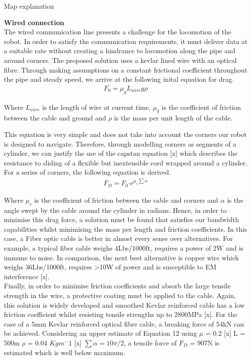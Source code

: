 \documentclass[11pt]{article}		%
\begin{document}
        Map explanation

        \textbf{Wired connection}\\
        The wired communication line presents a challenge for the locomotion of the robot. In order to satisfy the communication requirements, it must deliver data at a suitable rate without creating a hindrance to locomotion along the pipe and around corners. The proposed solution uses a kevlar lined wire with an optical fibre. 
        Through making assumptions on a constant frictional coefficient throughout the pipe and steady speed, we arrive at the following inital equation for drag. 
        \begin{align}
				F_0 = \mu_g L_{wire}   g \rho
		\end{align}
        
        Where $L_{wire}$ is the length of wire at current time, $\mu_g$ is the coefficient of friction between the cable and ground and $\rho$ is the mass per unit length of the cable.
        
        This equation is very simple and does not take into account the corners our robot is designed to navigate. Therefore, through modelling corners as segments of a cylinder, we can justify the use of the capstan equation [x] which describes the resistance to sliding of a flexible but inextensible cord wrapped around a cylinder. For a series of corners, the following equation is derived.
        \begin{align}
                F_D = F_0 \boldsymbol{\cdot} {e}^{\mu_c \sum \alpha}
        \end{align}

		Where $\mu_c$ is the coefficient of friction between the cable and corners and $\alpha$ is the angle swept by the cable around the cylinder in radians. 
	    Hence, in order to minimise this drag force, a solution must be found that satisfies our bandwidth capabilities whilst minimising the mass per length and friction coefficients.  
	    In this case, a Fiber optic cable is better in almost every sense over alternatives. For example, a typical fiber cable weighs 4Lbs/1000ft, requires a power of 2W and is immune to noise. In comparison, the next best alternative is copper wire which weighs 36Lbs/1000ft, requires >10W of power and is susceptible to EM interference [x]. \\
	    \hspace*{3ex}Finally, in order to minimise friction coefficients and absorb the large tensile strength in the wire, a protective coating must be applied to the cable. Again, this solution is widely developed and smoothed Kevlar reinforced cable has a low friction coefficient whilst resisting tensile strengths up to 2800MPa [x]. For the case of a 5mm Kevlar reinforced optical fibre cable, a breaking force of 54kN can be achieved. Considering an upper estimate of Equation 12 using $\mu$ = 0.2 [x] L = 500m $\rho$ = 0.04 $Kgm^-1$ [x] $\sum \alpha = 10\pi/2$, a tensile force of $F_D$ = 907N is estimated which is well below maximum. 
	    
\end{document}

